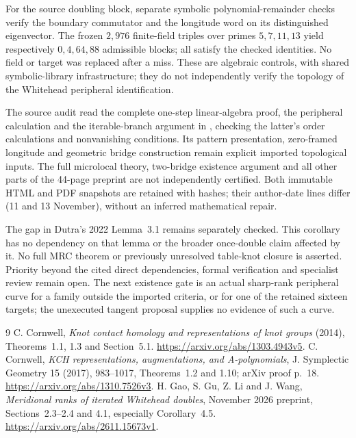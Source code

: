\documentclass[11pt]{article}
\begin{document}
For the source doubling block, separate symbolic polynomial-remainder
checks verify the boundary commutator and the longitude word on its
distinguished eigenvector. The frozen $2,976$ finite-field triples
over primes $5,7,11,13$ yield respectively $0,4,64,88$ admissible
blocks; all satisfy the checked identities. No field or target was
replaced after a miss. These are algebraic controls, with shared
symbolic-library infrastructure; they do not independently verify
the topology of the Whitehead peripheral identification.

The source audit read the complete one-step linear-algebra proof,
the peripheral calculation and the iterable-branch argument in
\cite[Sections~2.3--2.4 and 4.1]{gglw}, checking the latter's order
calculations and nonvanishing conditions. Its pattern presentation,
zero-framed longitude and geometric bridge construction remain
explicit imported topological inputs. The full microlocal theory,
two-bridge existence argument and all other parts of the 44-page
preprint are not independently certified. Both immutable HTML and
PDF snapshots are retained with hashes; their author-date lines
differ (11 and 13 November), without an inferred mathematical repair.

The gap in Dutra's 2022 Lemma~3.1 remains separately checked. This
corollary has no dependency on that lemma or the broader once-double
claim affected by it. No full MRC theorem or previously unresolved
table-knot closure is asserted. Priority beyond the cited direct
dependencies, formal verification and specialist review remain open.
The next existence gate is an actual sharp-rank peripheral curve
for a family outside the imported criteria, or for one of the
retained sixteen targets; the unexecuted tangent proposal supplies
no evidence of such a curve.

\begin{thebibliography}{9}
 C. Cornwell, \emph{Knot contact homology and
representations of knot groups} (2014), Theorems~1.1, 1.3 and
Section~5.1. \url{https://arxiv.org/abs/1303.4943v5}.
 C. Cornwell, \emph{KCH representations,
augmentations, and A-polynomials}, J. Symplectic Geometry 15
(2017), 983--1017, Theorems~1.2 and 1.10; arXiv proof p.~18.
\url{https://arxiv.org/abs/1310.7526v3}.
 H. Gao, S. Gu, Z. Li and J. Wang,
\emph{Meridional ranks of iterated Whitehead doubles}, November 2026
preprint, Sections~2.3--2.4 and 4.1, especially Corollary~4.5.
\url{https://arxiv.org/abs/2611.15673v1}.
\end{thebibliography}
\end{document}
